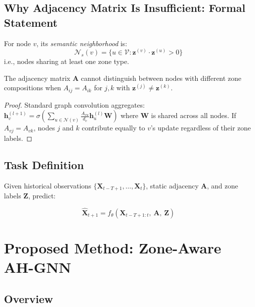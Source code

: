 \documentclass[12pt,a4paper]{article}
\begin{document}
\subsection{Why Adjacency Matrix Is Insufficient: Formal Statement}

\begin{definition}
For node $v$, its \textit{semantic neighborhood} is:
\[
\mathcal{N}_s(v) = \{u \in \mathcal{V} : \mathbf{z}^{(v)} \cdot \mathbf{z}^{(u)} > 0 \}
\]
i.e., nodes sharing at least one zone type.
\end{definition}

\begin{proposition}
The adjacency matrix $\mathbf{A}$ cannot distinguish between nodes with
different zone compositions when $A_{ij} = A_{ik}$ for $j,k$ with
$\mathbf{z}^{(j)} \neq \mathbf{z}^{(k)}$.
\end{proposition}

\begin{proof}
Standard graph convolution aggregates:
$\mathbf{h}_v^{(l+1)} = \sigma\!\left(\sum_{u \in \mathcal{N}(v)} \frac{A_{vu}}{d_v}
\mathbf{h}_u^{(l)} \mathbf{W}\right)$
where $\mathbf{W}$ is shared across all nodes. If $A_{vj} = A_{vk}$, nodes
$j$ and $k$ contribute equally to $v$'s update regardless of their zone labels.
\end{proof}

\subsection{Task Definition}

Given historical observations $\{\mathbf{X}_{t-T+1}, \ldots, \mathbf{X}_t\}$,
static adjacency $\mathbf{A}$, and zone labels $\mathbf{Z}$, predict:

\begin{equation}
\hat{\mathbf{X}}_{t+1} = f_\theta\!\left(\mathbf{X}_{t-T+1:t},\ \mathbf{A},\ \mathbf{Z}\right)
\end{equation}

\section{Proposed Method: Zone-Aware AH-GNN}

\subsection{Overview}
\end{document}
